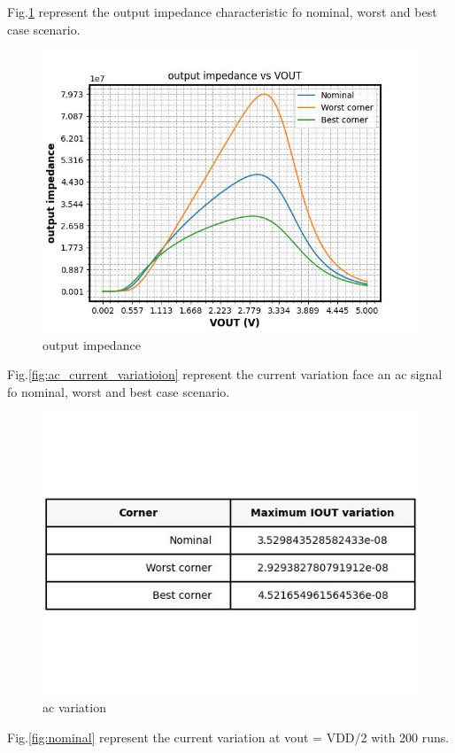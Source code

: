 \documentclass{article}
\begin{document}
Fig.\ref{fig:output_impedance} represent the output impedance characteristic fo nominal, worst and best case scenario.

\begin{figure}[H] %
    \centering
    \includegraphics[width=.7\textwidth]{./output_impedance_vs_VOUT.jpg} %
    \caption{output impedance}
    \label{fig:output_impedance}
\end{figure}



Fig.\ref{fig:ac_current_variatioion} represent the current variation face an ac signal fo nominal, worst and best case scenario.

\begin{figure}[H] %
    \centering
    \includegraphics[width=.7\textwidth]{./ac_bias_table.jpg} %
    \caption{ac variation}
    \label{fig:ac_current_variation}
\end{figure}

Fig.\ref{fig:nominal} represent the current variation at vout = VDD/2 with 200 runs.
\end{document}
